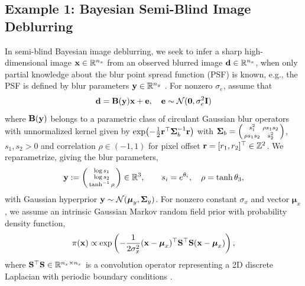 \documentclass[onefignum,onetabnum]{siamonline250211}
\newcommand{\thf}  {\tfrac{1}{2}}                            %
\renewcommand{\t} {^{\top}}                                %
\newcommand{\bfSigma}{{\boldsymbol{\Sigma}}}
\newcommand{\bfmu}{{\boldsymbol{\mu}}}
\newcommand{\bfB}{{\bf B}}
\newcommand{\bfI}{{\bf I}}
\newcommand{\bfS}{{\bf S}}
\newcommand{\bfd}{{\bf d}}
\newcommand{\bfe}{{\bf e}}
\newcommand{\bfr}{{\bf r}}
\newcommand{\bfx}{{\bf x}}
\newcommand{\bfy}{{\bf y}}
\newcommand{\bfzero}{{\bf0}}
\newcommand{\calN}{\mathcal{N}}
\newcommand{\bbR}{\mathbb{R}}
\newcommand{\bbZ}{\mathbb{Z}}
\newcommand{\nx}{{n_{x}}}
\begin{document}
%
%
%
\subsection{Example 1: Bayesian Semi-Blind Image Deblurring}
\label{sec:deblurring}

In semi-blind Bayesian image deblurring, we seek to infer a sharp high-dimensional image $\bfx\in\bbR^{\nx}$ from an observed blurred image $\bfd \in \bbR^{\nx}$, when only partial knowledge about the blur point spread function (PSF) is known, e.g., the PSF is defined by blur parameters $\bfy \in \bbR^{n_y}$ \cite{hansen_deblurring_2006}. 
For nonzero $\sigma_{e}$, assume that
\begin{equation}
\label{eq:semiblind_assumptions1}
\bfd = \bfB(\bfy)\bfx + \bfe, \quad \bfe\sim\calN(\bfzero,\sigma_{e}^{2}\bfI)
\end{equation}
where $\bfB(\bfy)$ belongs to a parametric class of circulant Gaussian blur operators with unnormalized kernel given by
$\exp \bigl(-\thf\bfr\t\bfSigma_b^{-1}\bfr\bigr)$ with $\bfSigma_b = \begin{psmallmatrix} s_1^2 & \rho s_1 s_2 \\ \rho s_1 s_2 & s_2^2 \end{psmallmatrix}$, $s_1,s_2>0$ and correlation $\rho\in(-1,1)$ for pixel offset $\bfr=[r_1, r_2]\t\in\bbZ^2$. We reparametrize, giving the blur parameters,
\begin{equation}
  \label{eq:deblur-theta}
  \bfy
  :=
  \begin{psmallmatrix}\log s_1 \\ \log s_2 \\ \tanh^{-1}\rho\end{psmallmatrix}
  \in\bbR^3,
  \qquad
  s_i = e^{\theta_i},\quad \rho = \tanh\theta_3,
\end{equation}
with Gaussian hyperprior $\bfy\sim \calN(\bfmu_y, \bfSigma_y)$.
For nonzero constant $\sigma_x$ and vector $\bfmu_x$, we assume an intrinsic Gaussian Markov random field prior with probability density function,
\begin{equation}
\label{eq:semiblind_assumptions2}
\pi(\bfx)\propto \exp\left(-\frac{1}{2 \sigma_x^2}(\bfx - \bfmu_x)\t \bfS\t \bfS (\bfx-\bfmu_x)\right),
\end{equation}
where $\bfS\t \bfS\in\bbR^{\nx\times\nx}$ is a convolution operator representing a 2D discrete Laplacian with periodic boundary conditions \cite{bardsley2018computational}.

%
%
%
%
%
%
%
%
%
%
%
%
\end{document}
